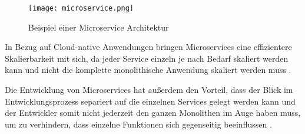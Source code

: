 \begin{figure}[H]
    \centering
    \texttt{[image: microservice.png]}
    \caption{Beispiel einer Microservice Architektur \cite[Nachbildung angelehnt an][S. 150]{Gos2020}}
    \label{fig:microservice}
\end{figure}

In Bezug auf Cloud-native Anwendungen bringen Microservices eine effizientere Skalierbarkeit mit sich, da jeder Service einzeln je nach Bedarf skaliert werden kann und nicht die komplette monolithische Anwendung skaliert werden muss \cite[Vgl.][]{Janssen2021}.

Die Entwicklung von Microservices hat außerdem den Vorteil, dass der Blick im Entwicklungsprozess separiert auf die einzelnen Services gelegt werden kann und der Entwickler somit nicht jederzeit den ganzen Monolithen im Auge haben muss, um zu verhindern, dass einzelne Funktionen sich gegenseitig beeinflussen \cite[Vgl.][]{Janssen2021}.


